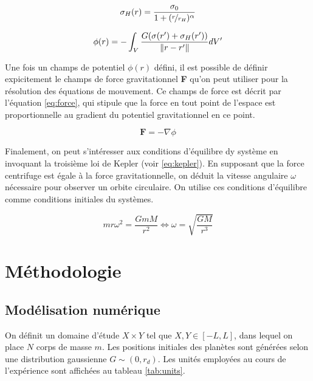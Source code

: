 \documentclass{article}
\begin{document}
\begin{equation}\label{eq:density_DM}
	\sigma_H(r) = \frac{\sigma_0}{1+(\nicefrac{r}{r_H})^{\alpha}}
\end{equation}

\begin{equation}\label{eq:potential_integral_DM}
	\phi(r) = - \int_{V} \frac{G (\sigma(r') + \sigma_H(r'))}{\norm{r-r'}}dV'
\end{equation}

Une fois un champs de potentiel $\phi(r)$ défini, il est possible de définir expicitement le champs de force gravitationnel \textbf{F} qu'on peut utiliser pour la résolution des équations de mouvement. Ce champs de force est décrit par l'équation \ref{eq:force}, qui stipule que la force en tout point de l'espace est proportionnelle au gradient du potentiel gravitationnel en ce point. 

\begin{equation}\label{eq:force}
	\textbf{F} = - \nabla \phi
\end{equation}

Finalement, on peut s'intéresser aux conditions d'équilibre dy système en invoquant la troisième loi de Kepler (voir \ref{eq:kepler}). En supposant que la force centrifuge est égale à la force gravitationnelle, on déduit la vitesse angulaire $\omega$ nécessaire pour observer un orbite circulaire. On utilise ces conditions d'équilibre comme conditions initiales du systèmes.

\begin{equation}\label{eq:kepler}
m r \omega^2 = \frac{GmM}{r^2} \Longleftrightarrow \omega = \sqrt{\frac{GM}{r^3}}
\end{equation}

\section{Méthodologie}\label{sec:methodologie}

\subsection{Modélisation numérique}\label{subsec:modelisation_numerique}

On définit un domaine d'étude $X \times Y$ tel que $X, Y \in [-L, L]$, dans lequel on place $N$ corps de masse $m$. Les positions initiales des planètes sont générées selon une distribution gaussienne $ G \sim (0, r_d)$. Les unités employées au cours de l'expérience sont affichées au tableau \ref{tab:units}.
\end{document}

